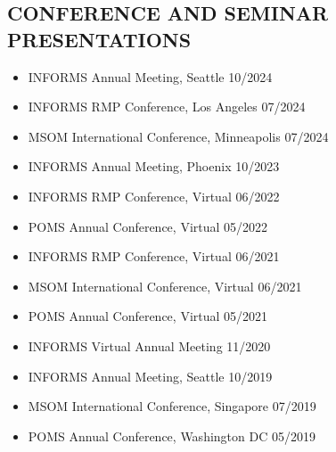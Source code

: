 \documentclass[margin]{res} %
\begin{document}
\begin{resume}
\section{CONFERENCE AND SEMINAR PRESENTATIONS}
\begin{itemize}[leftmargin=*]
    \item INFORMS Annual Meeting, Seattle \hfill 10/2024
    \item INFORMS RMP Conference, Los Angeles \hfill 07/2024
    \item MSOM International Conference, Minneapolis \hfill 07/2024
    \item INFORMS Annual Meeting, Phoenix \hfill 10/2023
    \item INFORMS RMP Conference, Virtual \hfill 06/2022
    \item POMS Annual Conference, Virtual \hfill 05/2022
    \item INFORMS RMP Conference, Virtual \hfill 06/2021
    \item MSOM International Conference, Virtual \hfill 06/2021
    \item POMS Annual Conference, Virtual \hfill 05/2021
    \item INFORMS Virtual Annual Meeting \hfill 11/2020
    \item INFORMS Annual Meeting, Seattle \hfill 10/2019
    \item MSOM International Conference, Singapore \hfill 07/2019
    \item POMS Annual Conference, Washington DC \hfill 05/2019
\end{itemize}


\end{resume}
\end{document}
